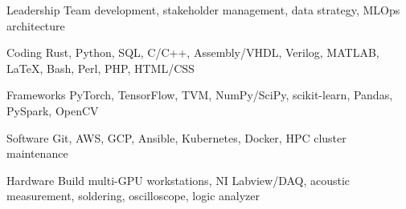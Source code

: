 

\begin{cvskills}

  \cvskill
    {Leadership} %
    {Team development, stakeholder management, data strategy, MLOps architecture} %

  \cvskill
    {Coding} %
    {Rust, Python, SQL, C/C++, Assembly/VHDL, Verilog, MATLAB\textregistered, %
    LaTeX, Bash, Perl, PHP, HTML/CSS} %

  \cvskill
    {Frameworks} %
    {PyTorch, TensorFlow, TVM, NumPy/SciPy, scikit-learn, Pandas, PySpark, OpenCV} %
    
  \cvskill
    {Software} %
    {Git, AWS, GCP, Ansible, Kubernetes, Docker, HPC cluster maintenance} %

   \cvskill
     {Hardware} %
     {Build multi-GPU workstations, NI Labview/DAQ, acoustic measurement, %
     soldering, oscilloscope, logic analyzer} %

\end{cvskills}
